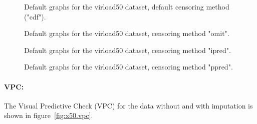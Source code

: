 \begin{figure}[!h]
\par\kern -0.3cm
\begin{center}
\end{center}
\par\kern -0.3cm
\caption{Default graphs for the virload50 dataset, default censoring method ({\sf "cdf"}).}\label{fig:x50.cdf}
\end{figure}

\begin{figure}[!h]
\par\kern -0.5cm
\begin{center}
\end{center}
\par\kern -0.5cm
\caption{Default graphs for the virload50 dataset, censoring method {\sf "omit"}.}\label{fig:x50.omit}
\end{figure}

\begin{figure}[!h]
\par\kern -0.5cm
\begin{center}
\end{center}
\par\kern -0.5cm
\caption{Default graphs for the virload50 dataset, censoring method {\sf "ipred"}.}\label{fig:x50.ipred}
\end{figure}

\clearpage
\begin{figure}[!h]
\par\kern -0.5cm
\begin{center}
\end{center}
\par\kern -0.5cm
\caption{Default graphs for the virload50 dataset, censoring method {\sf "ppred"}.}\label{fig:x50.ppred}
\end{figure}

\paragraph{VPC:} The Visual Predictive Check (VPC) for the data without and with imputation is shown in figure~\ref{fig:x50.vpc}.

